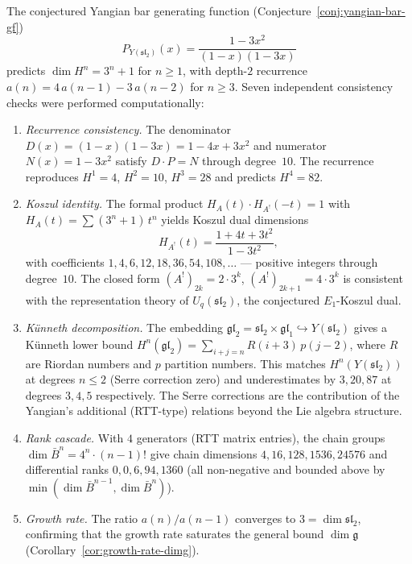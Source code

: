 The conjectured Yangian bar generating function
(Conjecture~\ref{conj:yangian-bar-gf})
\begin{equation}\label{eq:yangian-gf-appendix}
P_{Y(\mathfrak{sl}_2)}(x) = \frac{1 - 3x^2}{(1-x)(1-3x)}
\end{equation}
predicts $\dim H^n = 3^n + 1$ for $n \geq 1$, with depth-$2$ recurrence
$a(n) = 4\,a(n{-}1) - 3\,a(n{-}2)$ for $n \geq 3$.  Seven independent
consistency checks were performed computationally:

\begin{enumerate}[label=(\roman*)]
\item \emph{Recurrence consistency.}
The denominator $D(x) = (1-x)(1-3x) = 1 - 4x + 3x^2$
and numerator $N(x) = 1 - 3x^2$ satisfy $D \cdot P = N$
through degree~$10$.  The recurrence reproduces $H^1 = 4$,
$H^2 = 10$, $H^3 = 28$ and predicts $H^4 = 82$.

\item \emph{Koszul identity.}
The formal product $H_A(t) \cdot H_{A^!}(-t) = 1$
with $H_A(t) = \sum (3^n + 1)\,t^n$ yields
Koszul dual dimensions
\[
H_{A^!}(t) = \frac{1 + 4t + 3t^2}{1 - 3t^2},
\]
with coefficients $1, 4, 6, 12, 18, 36, 54, 108, \ldots$ ---
positive integers through degree~$10$.  The closed form
$(A^!)_{2k} = 2 \cdot 3^k$, $(A^!)_{2k+1} = 4 \cdot 3^k$
is consistent with the representation theory of
$U_q(\mathfrak{sl}_2)$, the conjectured $E_1$-Koszul dual.

\item \emph{K\"unneth decomposition.}
The embedding $\mathfrak{gl}_2 = \mathfrak{sl}_2 \times
\mathfrak{gl}_1 \hookrightarrow Y(\mathfrak{sl}_2)$
gives a K\"unneth lower bound $H^n(\mathfrak{gl}_2) = \sum_{i+j=n}
R(i+3)\,p(j-2)$, where $R$ are Riordan numbers and $p$
partition numbers.  This matches $H^n(Y(\mathfrak{sl}_2))$
at degrees $n \leq 2$ (Serre correction zero) and underestimates
by $3, 20, 87$ at degrees $3, 4, 5$ respectively.  The Serre
corrections are the contribution of the Yangian's additional
(RTT-type) relations beyond the Lie algebra structure.

\item \emph{Rank cascade.}
With $4$ generators (RTT matrix entries), the chain groups
$\dim \bar{B}^n = 4^n \cdot (n-1)!$ give chain dimensions
$4, 16, 128, 1536, 24576$ and differential ranks
$0, 0, 6, 94, 1360$ (all non-negative and bounded above by
$\min(\dim \bar{B}^{n-1}, \dim \bar{B}^n)$).

\item \emph{Growth rate.}
The ratio $a(n)/a(n{-}1)$ converges to $3 = \dim\mathfrak{sl}_2$,
confirming that the growth rate saturates the general bound
$\dim\mathfrak{g}$ (Corollary~\ref{cor:growth-rate-dimg}).


\end{enumerate}
